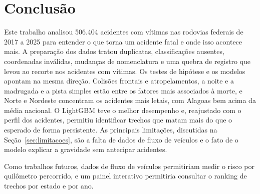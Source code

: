\documentclass[12pt]{article}
\begin{document}
\section{Conclusão}

Este trabalho analisou 506.404 acidentes com vítimas nas rodovias federais de 2017 a 2025 para entender o que torna um acidente fatal e onde isso acontece mais. A preparação dos dados tratou duplicatas, classificações ausentes, coordenadas inválidas, mudanças de nomenclatura e uma quebra de registro que levou ao recorte nos acidentes com vítimas. Os testes de hipótese e os modelos apontam na mesma direção. Colisões frontais e atropelamentos, a noite e a madrugada e a pista simples estão entre os fatores mais associados à morte, e Norte e Nordeste concentram os acidentes mais letais, com Alagoas bem acima da média nacional. O LightGBM teve o melhor desempenho e, reajustado com o perfil dos acidentes, permitiu identificar trechos que matam mais do que o esperado de forma persistente. As principais limitações, discutidas na Seção~\ref{sec:limitacoes}, são a falta de dados de fluxo de veículos e o fato de o modelo explicar a gravidade sem antecipar acidentes.

Como trabalhos futuros, dados de fluxo de veículos permitiriam medir o risco por quilômetro percorrido, e um painel interativo permitiria consultar o ranking de trechos por estado e por ano.



\end{document}

